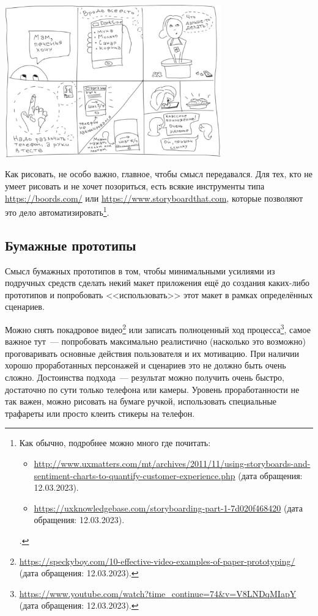 \documentclass{../../text-style}
\begin{document}
\begin{center}
    \includegraphics[width=0.7\textwidth]{storyboardingExample.png}
\end{center}

Как рисовать, не особо важно, главное, чтобы смысл передавался. Для тех, кто не умеет рисовать и не хочет позориться, есть всякие инструменты типа \url{https://boords.com/} или \url{https://www.storyboardthat.com}, которые позволяют это дело автоматизировать\footnote{Как обычно, подробнее можно много где почитать: 
\begin{itemize}
    \item \url{http://www.uxmatters.com/mt/archives/2011/11/using-storyboards-and-sentiment-charts-to-quantify-customer-experience.php} (дата обращения: 12.03.2023).
    \item \url{https://uxknowledgebase.com/storyboarding-part-1-7d020f468420} (дата обращения: 12.03.2023).
\end{itemize}.}.

\subsection{Бумажные прототипы}

Смысл бумажных прототипов в том, чтобы минимальными усилиями из подручных средств сделать некий макет приложения ещё до создания каких-либо прототипов и попробовать <<использовать>> этот макет в рамках определённых сценариев.

Можно снять покадровое видео\footnote{\url{https://speckyboy.com/10-effective-video-examples-of-paper-prototyping/} (дата обращения: 12.03.2023).} или записать полноценный ход процесса\footnote{\url{https://www.youtube.com/watch?time_continue=74&v=V8LNDqMIapY} (дата обращения: 12.03.2023).}, самое важное тут~--- попробовать максимально реалистично (насколько это возможно) проговаривать основные действия пользователя и их мотивацию. При наличии хорошо проработанных персонажей и сценариев это не должно быть очень сложно. Достоинства подхода~--- результат можно получить очень быстро, достаточно по сути только телефона или камеры. Уровень проработанности не так важен, можно рисовать на бумаге ручкой, использовать специальные трафареты или просто клеить стикеры на телефон.
\end{document}
